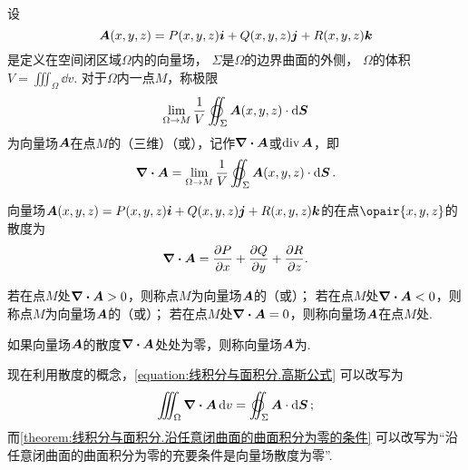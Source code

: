 \begin{definition}[空间中的散度]
\def\defofdiv{\lim\limits_{\Omega \to M} \frac{1}{V} \varoiint_{\Sigma} \mat{A}(x,y,z) \cdot \dd{\mat{S}}}%
设\[
\boldsymbol{A}(x,y,z)=P(x,y,z)\boldsymbol{i}+Q(x,y,z)\boldsymbol{j}+R(x,y,z)\boldsymbol{k}
\]是定义在空间闭区域\(\Omega\)内的向量场，%
\(\Sigma\)是\(\Omega\)的边界曲面的外侧，%
\(\Omega\)的体积\(V = \iiint_{\Omega} \dd{v}\).
对于\(\Omega\)内一点\(M\)，称极限\[
\defofdiv
\]为向量场\(\boldsymbol{A}\)在点\(M\)的（三维）（或），记作\(\div{\boldsymbol{A}}\)或\(\operatorname{div}\boldsymbol{A}\)，即\[
\div{\mat{A}} = \defofdiv.
\]
\end{definition}

\begin{theorem}
向量场\(\boldsymbol{A}(x,y,z)=P(x,y,z)\boldsymbol{i}+Q(x,y,z)\boldsymbol{j}+R(x,y,z)\boldsymbol{k}\)的在点\(\opair{x,y,z}\)的散度为\[
\div{\boldsymbol{A}} = \pdv{P}{x}+\pdv{Q}{y}+\pdv{R}{z}.
\]
\end{theorem}

\begin{definition}
若在点\(M\)处\(\div{\boldsymbol{A}}>0\)，则称点\(M\)为向量场\(\boldsymbol{A}\)的（或）；%
若在点\(M\)处\(\div{\boldsymbol{A}}<0\)，则称点\(M\)为向量场\(\boldsymbol{A}\)的（或）；%
若在点\(M\)处\(\div{\boldsymbol{A}}=0\)，则称向量场\(\boldsymbol{A}\)在点\(M\)处.

如果向量场\(\boldsymbol{A}\)的散度\(\div{\boldsymbol{A}}\)处处为零，则称向量场\(\boldsymbol{A}\)为.
\end{definition}

现在利用散度的概念，\cref{equation:线积分与面积分.高斯公式} 可以改写为
\begin{equation}\label{equation:线积分与面积分.高斯公式1}
	\iiint_{\Omega} \div{\mat{A}} \dd{v} = \varoiint_{\Sigma} \mat{A} \cdot \dd{\mat{S}};
\end{equation}
而\cref{theorem:线积分与面积分.沿任意闭曲面的曲面积分为零的条件}
可以改写为“沿任意闭曲面的曲面积分为零的充要条件是向量场散度为零”.

